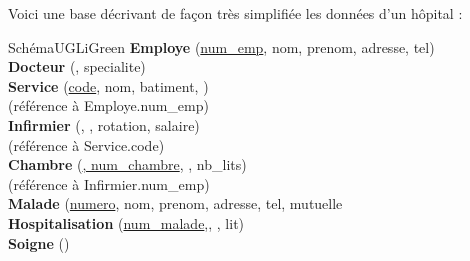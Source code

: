 \documentclass[a4paper,12pt,french]{book}
\begin{document}

Voici une base décrivant de façon très simplifiée les données d’un hôpital :

\begin{encadrecolore}{Schéma}{UGLiGreen}
{\textbf{Employe} (\underline{num\_emp}, nom, prenom, adresse, tel)}\\

{\textbf{Docteur} (, specialite)}\\

{\textbf{Service}	(\uline{code}, nom, batiment, )}\\
(référence à {Employe.num\_emp})\\

{\textbf{Infirmier} (, , rotation, salaire)}\\
(référence à {Service.code})\\

{\textbf{Chambre}	(\uline{, num\_chambre}, , nb\_lits)}\\
(référence à {Infirmier.num\_emp})\\


{\textbf{Malade} (\underline{numero}, nom, prenom, adresse, tel, mutuelle}\\

{\textbf{Hospitalisation} (\underline{num\_malade},, , lit)}\\

{\textbf{Soigne} ()}\\

\end{encadrecolore}
\end{document}
